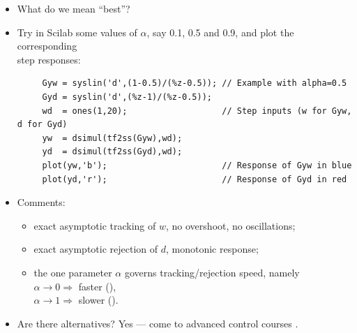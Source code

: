 \begin{frame}[fragile]
\myPause
 \begin{itemize}[<+-| alert@+>]
 \item What do we mean ``best''?
 \item Try in Scilab some values of $\alpha$, say 0.1, 0.5 and 0.9, and plot the corresponding\\
       step responses:
       {\scriptsize
       \begin{verbatim}
     Gyw = syslin('d',(1-0.5)/(%z-0.5)); // Example with alpha=0.5
     Gyd = syslin('d',(%z-1)/(%z-0.5));
     wd  = ones(1,20);                   // Step inputs (w for Gyw, d for Gyd)
     yw  = dsimul(tf2ss(Gyw),wd); 
     yd  = dsimul(tf2ss(Gyd),wd); 
     plot(yw,'b');                       // Response of Gyw in blue
     plot(yd,'r');                       // Response of Gyd in red
       \end{verbatim}
       }
 \item \vspace{-4mm}Comments:
       \begin{itemize}[<+-| alert@+>]
       \item exact asymptotic tracking of $w$, no overshoot, no oscillations;
       \item exact asymptotic rejection of $d$, monotonic response;
       \item the one parameter $\alpha$ governs tracking/rejection speed, namely\\
             $\alpha\rightarrow 0 \Rightarrow$ faster (),\\
             $\alpha\rightarrow 1 \Rightarrow$ slower ().
       \end{itemize}
 \item Are there alternatives? Yes --- come to advanced control courses \smiley.
 \end{itemize}
\end{frame}
